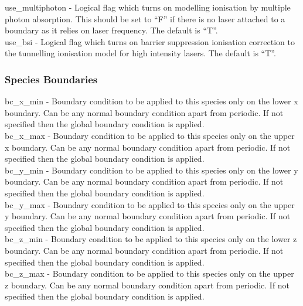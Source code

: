 {\emphtext use\_multiphoton} - Logical flag which turns on modelling
  ionisation by multiple photon absorption. This should be set to ``F'' if
  there is no laser attached to a boundary as it relies on laser frequency.
  The default is ``T''.\\

{\emphtext use\_bsi} - Logical flag which turns on barrier suppression
  ionisation correction to the tunnelling ionisation model for high intensity
  lasers. The default is ``T''.\\

\subsubsection{Species Boundaries}
\label{sec:per_species_bcs}

{\emphtext bc\_x\_min} - Boundary condition to be applied to this species only
on the lower x boundary. Can be any normal boundary condition apart
from periodic. If not specified then the global boundary condition is applied.\\

{\emphtext bc\_x\_max} - Boundary condition to be applied to this species only
on the upper x boundary. Can be any normal boundary condition apart
from periodic. If not specified then the global boundary condition is applied.\\

{\emphtext bc\_y\_min} - Boundary condition to be applied to this species only
on the lower y boundary. Can be any normal boundary condition apart
from periodic. If not specified then the global boundary condition is applied.\\

{\emphtext bc\_y\_max} - Boundary condition to be applied to this species only
on the upper y boundary. Can be any normal boundary condition apart
from periodic. If not specified then the global boundary condition is applied.\\

{\emphtext bc\_z\_min} - Boundary condition to be applied to this species only
on the lower z boundary. Can be any normal boundary condition apart
from periodic. If not specified then the global boundary condition is applied.\\

{\emphtext bc\_z\_max} - Boundary condition to be applied to this species only
on the upper z boundary. Can be any normal boundary condition apart
from periodic. If not specified then the global boundary condition is applied.\\

